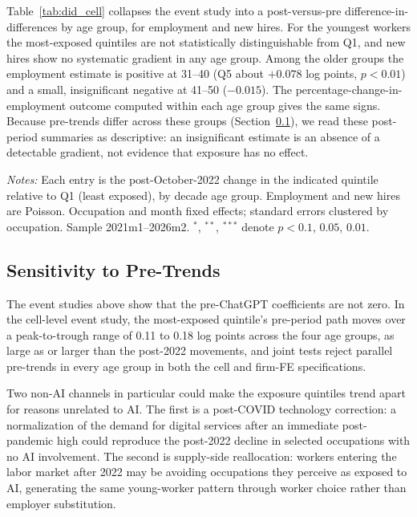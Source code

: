 \documentclass[12pt]{article}
\begin{document}
Table~\ref{tab:did_cell} collapses the event study into a post-versus-pre difference-in-differences by age group, for employment and new hires. For the youngest workers the most-exposed quintiles are not statistically distinguishable from Q1, and new hires show no systematic gradient in any age group. Among the older groups the employment estimate is positive at 31--40 (Q5 about $+0.078$ log points, $p<0.01$) and a small, insignificant negative at 41--50 ($-0.015$). The percentage-change-in-employment outcome computed within each age group gives the same signs. Because pre-trends differ across these groups (Section~\ref{sec:regression:robust}), we read these post-period summaries as descriptive: an insignificant estimate is an absence of a detectable gradient, not evidence that exposure has no effect.

\begin{table}[tp]
  \centering
  \caption{Cell-level difference-in-differences by AI-exposure quintile and decade age group, private sector.}
  \label{tab:did_cell}
  
  \begin{minipage}{\textwidth}\footnotesize\textit{Notes:} Each entry is the post-October-2022 change in the indicated quintile relative to Q1 (least exposed), by decade age group. Employment and new hires are Poisson. Occupation and month fixed effects; standard errors clustered by occupation. Sample 2021m1--2026m2. $^{*}$, $^{**}$, $^{***}$ denote $p<0.1$, $0.05$, $0.01$.\end{minipage}
\end{table}

\subsection{Sensitivity to Pre-Trends}\label{sec:regression:robust}

The event studies above show that the pre-ChatGPT coefficients are not zero. In the cell-level event study, the most-exposed quintile's pre-period path moves over a peak-to-trough range of 0.11 to 0.18 log points across the four age groups, as large as or larger than the post-2022 movements, and joint tests reject parallel pre-trends in every age group in both the cell and firm-FE specifications.

Two non-AI channels in particular could make the exposure quintiles trend apart for reasons unrelated to AI. The first is a post-COVID technology correction: a normalization of the demand for digital services after an immediate post-pandemic high could reproduce the post-2022 decline in selected occupations with no AI involvement. The second is supply-side reallocation: workers entering the labor market after 2022 may be avoiding occupations they perceive as exposed to AI, generating the same young-worker pattern through worker choice rather than employer substitution.
\end{document}
